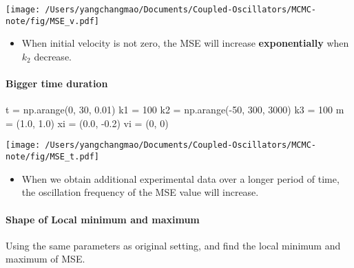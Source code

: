 \documentclass[
]{article}
\newenvironment{Shaded}{}{}
\newcommand{\DecValTok}[1]{\textcolor[rgb]{0.25,0.63,0.44}{#1}}
\newcommand{\FloatTok}[1]{\textcolor[rgb]{0.25,0.63,0.44}{#1}}
\newcommand{\NormalTok}[1]{#1}
\newcommand{\OperatorTok}[1]{\textcolor[rgb]{0.40,0.40,0.40}{#1}}
\begin{document}
\texttt{[image: /Users/yangchangmao/Documents/Coupled-Oscillators/MCMC-note/fig/MSE\_v.pdf]}

\begin{itemize}
\item
  When initial velocity is not zero, the MSE will increase
  \textbf{exponentially} when \(k_2\) decrease.
\end{itemize}

\hypertarget{bigger-time-duration}{%
\paragraph{Bigger time duration}\label{bigger-time-duration}}

\begin{Shaded}
\begin{Highlighting}[]
\NormalTok{t  }\OperatorTok{=}\NormalTok{ np.arange(}\DecValTok{0}\NormalTok{, }\DecValTok{30}\NormalTok{, }\FloatTok{0.01}\NormalTok{)}
\NormalTok{k1 }\OperatorTok{=} \DecValTok{100}
\NormalTok{k2 }\OperatorTok{=}\NormalTok{ np.arange(}\OperatorTok{{-}}\DecValTok{50}\NormalTok{, }\DecValTok{300}\NormalTok{, }\DecValTok{3000}\NormalTok{)}
\NormalTok{k3 }\OperatorTok{=} \DecValTok{100}
\NormalTok{m  }\OperatorTok{=}\NormalTok{ (}\FloatTok{1.0}\NormalTok{, }\FloatTok{1.0}\NormalTok{)}
\NormalTok{xi }\OperatorTok{=}\NormalTok{ (}\FloatTok{0.0}\NormalTok{, }\OperatorTok{{-}}\FloatTok{0.2}\NormalTok{)}
\NormalTok{vi }\OperatorTok{=}\NormalTok{ (}\DecValTok{0}\NormalTok{, }\DecValTok{0}\NormalTok{)}
\end{Highlighting}
\end{Shaded}

\texttt{[image: /Users/yangchangmao/Documents/Coupled-Oscillators/MCMC-note/fig/MSE\_t.pdf]}

\begin{itemize}
\item
  When we obtain additional experimental data over a longer period of
  time, the oscillation frequency of the MSE value will increase.
\end{itemize}

\hypertarget{shape-of-local-minimum-and-maximum}{%
\paragraph{Shape of Local minimum and
maximum}\label{shape-of-local-minimum-and-maximum}}

Using the same parameters as original setting, and find the local
minimum and maximum of MSE.
\end{document}
